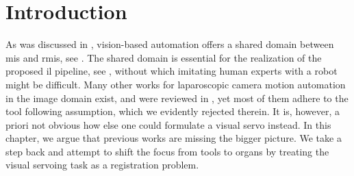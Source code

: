 


\section{Introduction}
\label{c2:sec:introduction}
As was discussed in , vision-based automation offers a shared domain between \gls{mis} and \gls{rmis}, see . The shared domain is essential for the realization of the proposed \gls{il} pipeline, see , without which imitating human experts with a robot might be difficult. Many other works for laparoscopic camera motion automation in the image domain exist, and were reviewed in , yet most of them adhere to the tool following assumption, which we evidently rejected therein. It is, however, a priori not obvious how else one could formulate a visual servo instead. In this chapter, we argue that previous works are missing the bigger picture. We take a step back and attempt to shift the focus from tools to organs by treating the visual servoing task as a registration problem.

